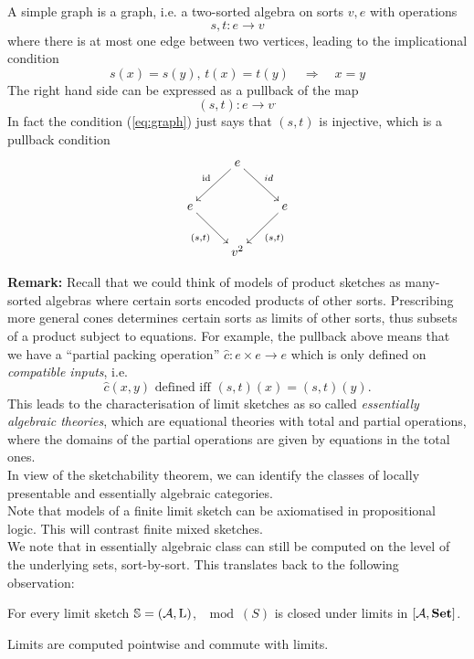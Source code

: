 \begin{Example}
A simple graph is a graph, i.e. a two-sorted algebra on sorts $v,e$ with operations
\[ s, t : e \to v \]
where there is at most one edge between two vertices, leading to the implicational condition
\begin{equation}\label{eq:graph} s(x) = s(y),\, t(x) = t(y) \quad \Rightarrow \quad x = y \end{equation}
The right hand side can be expressed as a pullback of the map \[ (s,t) : e \to v^. \]
In fact the condition (\ref{eq:graph}) just says that $(s,t)$ is injective, which is a pullback condition
\[
\xymatrix{
 & e \ar[ld]_{\id} \ar[rd]^{id} & \\
e \ar[rd]_{(s,t)} &  & e \ar[ld]^{(s,t)} \\
 & v^2 &
}\]
\end{Example}

\textbf{Remark: } Recall that we could think of models of product sketches as many-sorted algebras where certain sorts encoded products of other sorts. Prescribing more general cones determines certain sorts as limits of other sorts, thus subsets of a product subject to equations. For example, the pullback above means that we have a ``partial packing operation'' $\hat c : e \times e \to e$ which is only defined on \emph{compatible inputs}, i.e.
\[ \hat c(x,y) \text{ defined iff } (s,t)(x) = (s,t)(y). \]
This leads to the characterisation of limit sketches as so called \emph{essentially algebraic theories}, which are equational theories with total and partial operations, where the domains of the partial operations are given by equations in the total ones. \\

In view of the sketchability theorem, we can identify the classes of locally presentable and essentially algebraic categories. \\

Note that models of a finite limit sketch can be axiomatised in propositional logic. This will contrast finite mixed sketches. \\ %

We note that in essentially algebraic class can still be computed on the level of the underlying sets, sort-by-sort. This translates back to the following observation:

\begin{Proposition}
For every limit sketch $\mathbb S = (\mathcal{A}, \textrm{L})$, $\mod(S)$ is closed under limits in $[\mathcal{A},\mathbf{Set}]$.
\end{Proposition}
\begin{Proof}
Limits are computed pointwise and commute with limits. %
\end{Proof}

